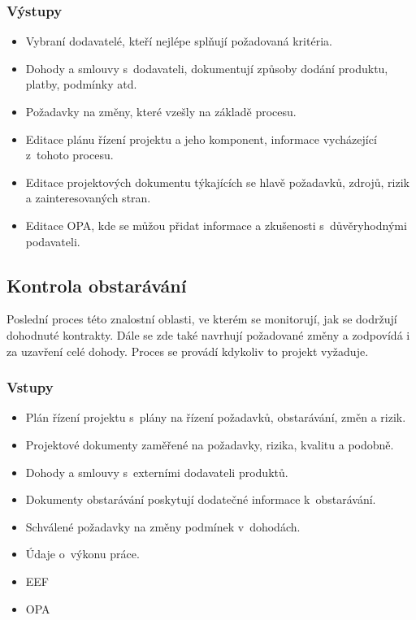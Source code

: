 \subsubsection*{Výstupy}
\begin{itemize}
    \item Vybraní dodavatelé, kteří nejlépe splňují požadovaná kritéria.
    \item Dohody a smlouvy s~dodavateli, dokumentují způsoby dodání produktu, platby, podmínky atd.
    \item Požadavky na změny, které vzešly na základě procesu.
    \item Editace plánu řízení projektu a jeho komponent, informace vycházející z~tohoto procesu.
    \item Editace projektových dokumentu týkajících se hlavě požadavků, zdrojů, rizik a zainteresovaných stran.
    \item Editace OPA, kde se můžou přidat informace a zkušenosti s~důvěryhodnými podavateli.
\end{itemize}


\subsection*{Kontrola obstarávání}

Poslední proces této znalostní oblasti, ve kterém se monitorují, jak se dodržují dohodnuté kontrakty. Dále se zde také navrhují požadované změny a zodpovídá i za uzavření celé dohody. Proces se provádí kdykoliv to projekt vyžaduje.

\subsubsection*{Vstupy}
\begin{itemize}
    \item Plán řízení projektu s~plány na řízení požadavků, obstarávání, změn a rizik.
    \item Projektové dokumenty zaměřené na požadavky, rizika, kvalitu a podobně.
    \item Dohody a smlouvy s~externími dodavateli produktů.
    \item Dokumenty obstarávání poskytují dodatečné informace k~obstarávání.
    \item Schválené požadavky na změny podmínek v~dohodách.
    \item Údaje o~výkonu práce. 
    \item EEF
    \item OPA
\end{itemize}
